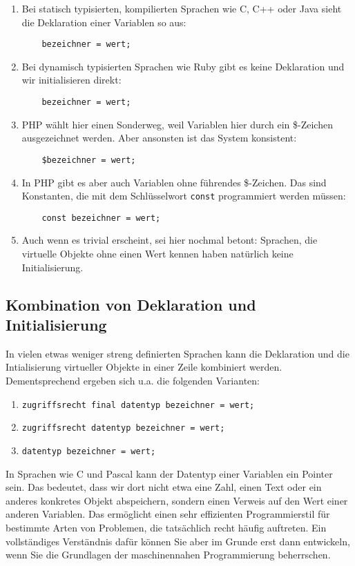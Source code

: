 \begin{enumerate}
	\item Bei statisch typisierten, kompilierten Sprachen wie C, C++ oder Java sieht die Deklaration einer Variablen so aus:
	\begin{verbatim}
	bezeichner = wert;
	\end{verbatim}
	\item Bei dynamisch typisierten Sprachen wie Ruby gibt es keine Deklaration und wir initialisieren direkt:
	\begin{verbatim}
	bezeichner = wert;
	\end{verbatim}
	\item PHP wählt hier einen Sonderweg, weil Variablen hier durch ein \$-Zeichen ausgezeichnet werden. Aber ansonsten ist das System konsistent:
	\begin{verbatim}
	$bezeichner = wert;
	\end{verbatim}
	\item In PHP gibt es aber auch Variablen ohne führendes \$-Zeichen. Das sind Konstanten, die mit dem Schlüsselwort \verb|const| programmiert werden müssen:
	\begin{verbatim}
	const bezeichner = wert;
	\end{verbatim}
	\item Auch wenn es trivial erscheint, sei hier nochmal betont: Sprachen, die virtuelle Objekte ohne einen Wert kennen haben natürlich keine Initialisierung.
\end{enumerate}

\subsection{Kombination von Deklaration und Initialisierung}

In vielen etwas weniger streng definierten Sprachen kann die Deklaration und die Intialisierung virtueller Objekte in einer Zeile kombiniert werden. Dementsprechend ergeben sich u.a. die folgenden Varianten:

\begin{enumerate}
	\item \verb|zugriffsrecht final datentyp bezeichner = wert;|
	\item \verb|zugriffsrecht datentyp bezeichner = wert;|
	\item \verb|datentyp bezeichner = wert;|
\end{enumerate}

In Sprachen wie C und Pascal kann der \glqq{}Datentyp\grqq{} einer Variablen ein Pointer sein. Das bedeutet, dass wir dort nicht etwa eine Zahl, einen Text oder ein anderes konkretes Objekt abspeichern, sondern einen Verweis auf den Wert einer anderen Variablen. Das ermöglicht einen sehr effizienten Programmierstil für bestimmte Arten von Problemen, die tatsächlich recht häufig auftreten. Ein vollständiges Verständnis dafür können Sie aber im Grunde erst dann entwickeln, wenn Sie die Grundlagen der maschinennahen Programmierung beherrschen.\\

